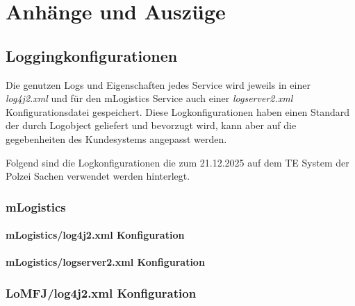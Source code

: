 \chapter{Anhänge und Auszüge}
\label{chap:logs_and_attachements}

\section{Loggingkonfigurationen}
Die genutzen Logs und Eigenschaften jedes Service wird jeweils in einer \textit{log4j2.xml} und für den mLogistics Service auch einer \textit{logserver2.xml} Konfigurationsdatei gespeichert.
Diese Logkonfigurationen haben einen Standard der durch Logobject geliefert und bevorzugt wird, kann aber auf die gegebenheiten des Kundesystems angepasst werden.

Folgend sind die Logkonfigurationen die zum 21.12.2025 auf dem TE System der Polzei Sachen verwendet werden hinterlegt.
\subsection{mLogistics}


\subsubsection{mLogistics/log4j2.xml Konfiguration} 
\label{subsec:mlogistics_log4j2_config}


\subsubsection{mLogistics/logserver2.xml Konfiguration}
\label{subsec:mlogistics_logserver2_config}


\subsection{LoMFJ/log4j2.xml Konfiguration} 
\label{subsec:loMFJ_log4j2_config}


